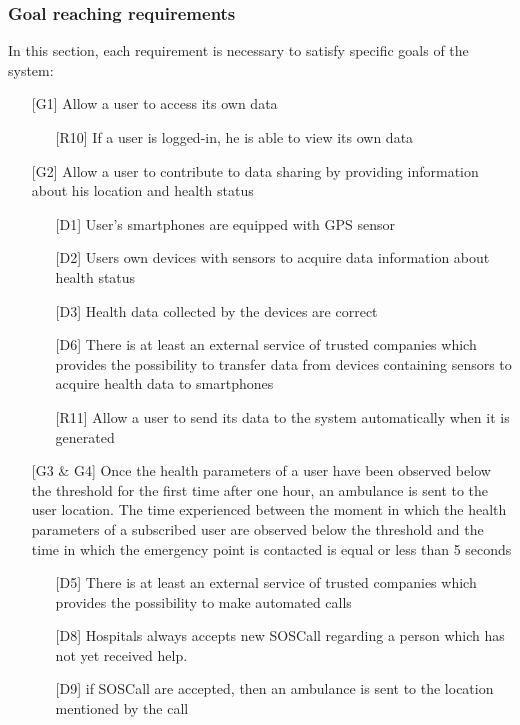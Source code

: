 \subsubsection{Goal reaching requirements}
\par
In this section, each requirement is necessary to satisfy specific goals of the system:
\begin{itemize}
\item[{[G1]}] Allow a user to access its own data
	\begin{itemize}
	\item[{[R10]}] If a user is logged-in, he is able to view its own data
	\end{itemize}
\item[{[G2]}] Allow a user to contribute to data sharing by providing information about his location and health status
	\begin{itemize}
	\item[{[D1]}]  User's smartphones are equipped with GPS sensor
	\item[{[D2]}] Users own devices with sensors to acquire data information about health status
	\item[{[D3]}] Health data collected by the devices are correct
	\item[{[D6]}] There is at least an external service of trusted companies which provides the possibility to transfer data from devices containing sensors to acquire health data to smartphones
	\item[{[R11]}] Allow a user to send its data to the system automatically when it is generated
	\end{itemize}
\item[{[G3 \& G4]}] Once the health parameters of a user have been observed 
below the threshold for the first time after one hour, an ambulance is sent to the user location. 
The time experienced between the moment in which the health parameters of a subscribed user are observed below the threshold and the time in which the emergency point is contacted is equal or less than 5 seconds
	\begin{itemize}
	\item[{[D5]}] There is at least an external service of trusted companies which provides the possibility to make automated calls
	\item[{[D8]}] Hospitals always accepts new SOSCall regarding a person which has not yet received help.
	\item[{[D9]}] if SOSCall are accepted, then an ambulance is sent to the location mentioned by the call

\end{itemize}
\end{itemize}
